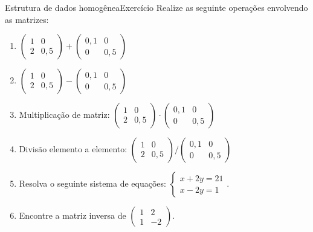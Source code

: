 \documentclass[
  10pt,
  ignorenonframetext,
]{beamer}
\providecommand{\tightlist}{%
  \setlength{\itemsep}{0pt}\setlength{\parskip}{0pt}}\usepackage{longtable,booktabs,array}
\begin{document}
\begin{frame}{Estrutura de dados homogênea\newline Exercício}
\protect\hypertarget{estrutura-de-dados-homoguxeaneaexercuxedcio-2}{}
Realize as seguinte operações envolvendo as matrizes:

\begin{enumerate}
\tightlist
\item
  \(\begin{pmatrix} 1 & 0\\ 2 & 0,5 \end{pmatrix} + \begin{pmatrix} 0,1 & 0\\ 0 & 0,5 \end{pmatrix}\)
\item
  \(\begin{pmatrix} 1 & 0\\ 2 & 0,5 \end{pmatrix} - \begin{pmatrix} 0,1 & 0\\ 0 & 0,5 \end{pmatrix}\)
\item
  Multiplicação de matriz:
  \(\begin{pmatrix} 1 & 0\\ 2 & 0,5 \end{pmatrix} \cdot \begin{pmatrix} 0,1 & 0\\ 0 & 0,5 \end{pmatrix}\)
\item
  Divisão elemento a elemento:
  \(\begin{pmatrix} 1 & 0\\ 2 & 0,5 \end{pmatrix} / \begin{pmatrix} 0,1 & 0\\ 0 & 0,5 \end{pmatrix}\)
\item
  Resolva o seguinte sistema de equações:
  \(\begin{cases} x + 2 y = 21 \\ x - 2y = 1 \end{cases}\).
\item
  Encontre a matriz inversa de
  \(\begin{pmatrix} 1 & 2 \\ 1 & -2 \end{pmatrix}\).
\end{enumerate}
\end{frame}
\end{document}
